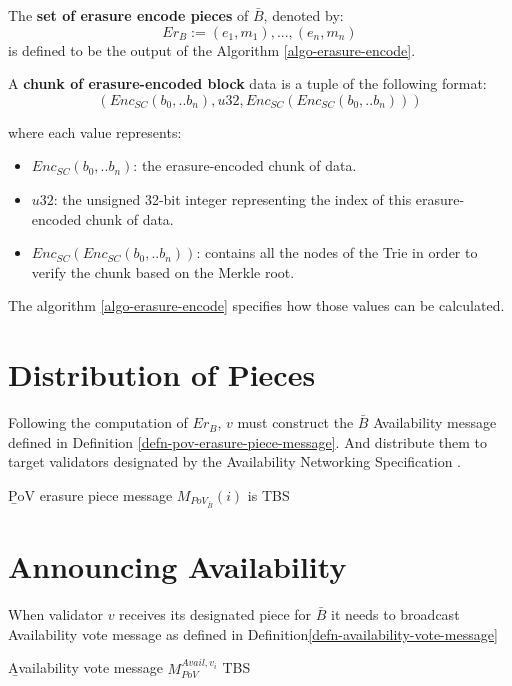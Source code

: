 \begin{definition}
  \label{defn-erasure-coded-pieces}
  The {\bf set of erasure encode pieces} of $\bar{B}$, denoted by:
  \[
   Er_B := {(e_1, m_1),...,(e_n,m_n)}
   \]
   is defined to be the output of the Algorithm \ref{algo-erasure-encode}.
\end{definition}

\begin{definition}
  \label{defn-erasure-chunk}
  A \textbf{chunk of erasure-encoded block} data is a tuple of the following format:
  \[
    (Enc_{SC}(b_0, .. b_n), u32, Enc_{SC}(Enc_{SC}(b_0, .. b_n)))
  \]

  where each value represents:
  \begin{itemize}
    \item $Enc_{SC}(b_0, .. b_n)$: the erasure-encoded chunk of data.
    \item $u32$: the unsigned 32-bit integer representing the index of this
    erasure-encoded chunk of data.
    \item $Enc_{SC}(Enc_{SC}(b_0, .. b_n))$: contains all the nodes of the Trie
    in order to verify the chunk based on the Merkle root.
  \end{itemize}

  The algorithm \ref{algo-erasure-encode} specifies how those values can be
  calculated.
\end{definition}

\section{Distribution of Pieces}\label{sect-distribute-pieces} Following the
computation of $Er_B$, $v$ must construct the $\bar{B}$ Availability message
defined in Definition \ref{defn-pov-erasure-piece-message}. And distribute them
to target validators designated by the Availability Networking Specification
\cite{??}.

\begin{definition}
  \label{defn-pov-erasure-piece-message}
        {\b PoV erasure piece message} $M_{PoV_{\bar{B}}}(i)$ is TBS
\end{definition}

\section{Announcing Availability}\label{sect-voting-on-availability}

When validator $v$ receives its designated piece for $\bar{B}$ it needs to
broadcast Availability vote message as defined in
Definition\ref{defn-availability-vote-message}
\begin{definition}
  \label{defn-availability-vote-message}
        {\b Availability vote message} $M_{PoV}^{Avail,v_i}$ TBS
\end{definition}

